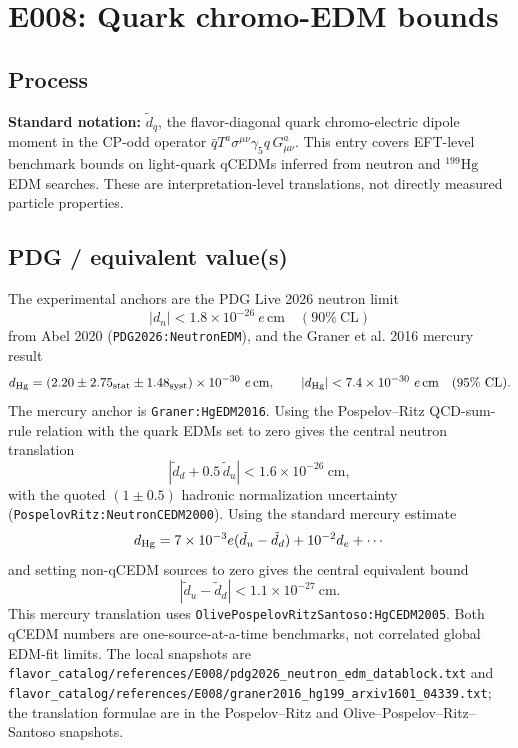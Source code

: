 
\section{E008: Quark chromo-EDM bounds}

\subsection*{Process}
\textbf{Standard notation:} \(\tilde d_q\), the flavor-diagonal quark
chromo-electric dipole moment in the CP-odd operator
\(\bar q T^a \sigma^{\mu\nu}\gamma_5 q\,G^a_{\mu\nu}\).  This entry covers
EFT-level benchmark bounds on light-quark qCEDMs inferred from neutron and
\(^{199}\mathrm{Hg}\) EDM searches.  These are interpretation-level
translations, not directly measured particle properties.

\subsection*{PDG / equivalent value(s)}
The experimental anchors are the PDG Live 2026 neutron limit
\[
  |d_n| < 1.8\times10^{-26}\ e\,\mathrm{cm}\quad(90\%~\mathrm{CL})
\]
from Abel 2020 (\texttt{PDG2026:NeutronEDM}), and the Graner et al. 2016
mercury result
\[
  d_{\rm Hg}=(2.20\pm2.75_{\rm stat}\pm1.48_{\rm syst})\times10^{-30}
  \ e\,\mathrm{cm},\qquad
  |d_{\rm Hg}|<7.4\times10^{-30}\ e\,\mathrm{cm}\quad(95\%~\mathrm{CL}).
\]
The mercury anchor is \texttt{Graner:HgEDM2016}.  Using the Pospelov--Ritz
QCD-sum-rule relation with the quark EDMs set to zero gives the central
neutron translation
\[
  |\tilde d_d+0.5\,\tilde d_u| < 1.6\times10^{-26}\ \mathrm{cm},
\]
with the quoted \((1\pm0.5)\) hadronic normalization uncertainty
(\texttt{PospelovRitz:NeutronCEDM2000}).  Using the standard mercury estimate
\[
  d_{\rm Hg}=7\times10^{-3}e(\tilde d_u-\tilde d_d)+10^{-2}d_e+\cdots
\]
and setting non-qCEDM sources to zero gives the central equivalent bound
\[
  |\tilde d_u-\tilde d_d| < 1.1\times10^{-27}\ \mathrm{cm}.
\]
This mercury translation uses
\texttt{OlivePospelovRitzSantoso:HgCEDM2005}.  Both qCEDM numbers are
one-source-at-a-time benchmarks, not correlated global EDM-fit limits.
The local snapshots are
\texttt{flavor\_catalog/references/E008/pdg2026\_neutron\_edm\_datablock.txt}
and \texttt{flavor\_catalog/references/E008/graner2016\_hg199\_arxiv1601\_04339.txt};
the translation formulae are in the Pospelov--Ritz and
Olive--Pospelov--Ritz--Santoso snapshots.

